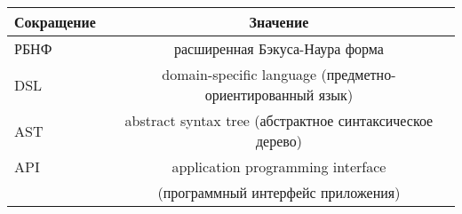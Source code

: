 \begin{table}[!ht]
    \Large
    \centering
    \begin{tabularx}{\textwidth}{|X|c|}
        \hline
        Сокращение & Значение                                                  \\
        \hline
        РБНФ       & расширенная Бэкуса-Наура форма                            \\
        \hline
        DSL        & domain-specific language (предметно-ориентированный язык) \\
        \hline
        AST        & abstract syntax tree (абстрактное синтаксическое дерево)  \\
        \hline
        API        & application programming interface                         \\
                   & (программный интерфейс приложения)                        \\
        \hline
    \end{tabularx}
    \vspace{\bottompaddingoftable}
\end{table}